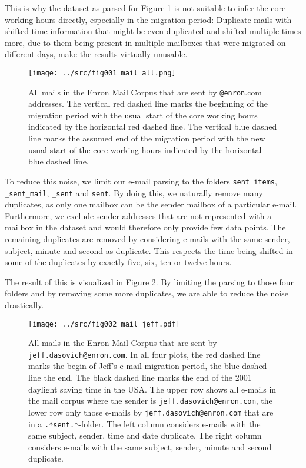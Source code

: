 \documentclass{article}
\begin{document}
This is why the dataset as parsed for Figure \ref{fig:allmail} is not suitable
to infer the core working hours directly, especially in the migration period:
Duplicate mails with shifted time information that might be even duplicated and
shifted multiple times more, due to them being present in multiple mailboxes
that were migrated on different days, make the results virtually unusable.

\begin{figure}
  \centering
  \texttt{[image: ../src/fig001\_mail\_all.png]}
   \caption{All mails in the Enron Mail Corpus that are sent by
  \texttt{@enron}.com addresses. The vertical red dashed line marks the beginning of
  the migration period with the usual start of the core working hours indicated
  by the horizontal red dashed line. The vertical blue dashed line marks the
  assumed end of the migration period with the new usual start of the core
  working hours indicated by the horizontal blue dashed line.}
  \label{fig:allmail}
  \vspace{-4mm}
\end{figure}

To reduce this noise, we limit our e-mail parsing to the folders
\texttt{sent\_items}, \texttt{\_sent\_mail}, \texttt{\_sent} and \texttt{sent}.
By doing this, we naturally remove many duplicates, as only one mailbox can be
the sender mailbox of a particular e-mail. Furthermore, we exclude sender
addresses that are not represented with a mailbox in the dataset and would
therefore only provide few data points. The remaining duplicates are removed by
considering e-mails with the same sender, subject, minute and second as
duplicate. This respects the time being shifted in some of the duplicates by
exactly five, six, ten or twelve hours.

The result of this is visualized in Figure \ref{fig:jeffmail}. By limiting the
parsing to those four folders and by removing some more duplicates, we are able
to reduce the noise drastically.

\begin{figure}
  \centering
  \texttt{[image: ../src/fig002\_mail\_jeff.pdf]}
  \label{fig:jeffmail}
  \caption{All mails in the Enron Mail Corpus that are sent by
  \texttt{jeff.dasovich@enron.com}. In all four plots, the red dashed line marks
  the begin of Jeff's e-mail migration period, the blue dashed line the end. The
  black dashed line marks the end of the 2001 daylight saving time in the USA.
  The upper row shows all e-mails in the mail corpus where the sender is
  \texttt{jeff.dasovich@enron.com}, the lower row only those e-mails by
  \texttt{jeff.dasovich@enron.com} that are in a \texttt{.*sent.*}-folder. The
  left column considers e-mails with the same subject, sender, time and date
  duplicate. The right column considers e-mails with the same subject, sender,
  minute and second duplicate.}
\end{figure}
\end{document}
